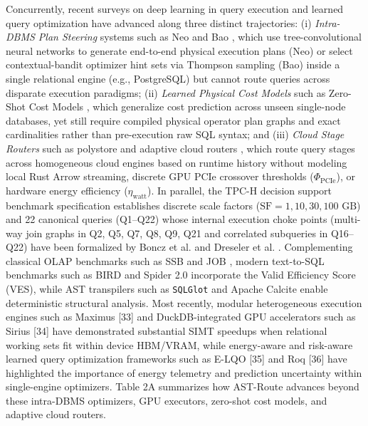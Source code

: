\documentclass[10pt,a4paper]{article}
\begin{document}
Concurrently, recent surveys on deep learning in query execution \cite{milicevic2024dlquery} and learned query optimization have advanced along three distinct trajectories: (i) \emph{Intra-DBMS Plan Steering} systems such as Neo \cite{marcus2019neo} and Bao \cite{marcus2021bao}, which use tree-convolutional neural networks to generate end-to-end physical execution plans (Neo) or select contextual-bandit optimizer hint sets via Thompson sampling (Bao) inside a single relational engine (e.g., PostgreSQL) but cannot route queries across disparate execution paradigms; (ii) \emph{Learned Physical Cost Models} such as Zero-Shot Cost Models \cite{hilprecht2022zeroshot}, which generalize cost prediction across unseen single-node databases, yet still require compiled physical operator plan graphs and exact cardinalities rather than pre-execution raw SQL syntax; and (iii) \emph{Cloud Stage Routers} such as polystore and adaptive cloud routers \cite{tan2023stage, gupta2023adaptive}, which route query stages across homogeneous cloud engines based on runtime history without modeling local Rust Arrow streaming, discrete GPU PCIe crossover thresholds ($\Phi_{\text{PCIe}}$), or hardware energy efficiency ($\eta_{\text{watt}}$). In parallel, the TPC-H decision support benchmark specification \cite{tpc2022tpch} establishes discrete scale factors ($\text{SF}=1, 10, 30, 100\text{ GB}$) and 22 canonical queries (Q1--Q22) whose internal execution choke points (multi-way join graphs in Q2, Q5, Q7, Q8, Q9, Q21 and correlated subqueries in Q16--Q22) have been formalized by Boncz et al. \cite{boncz2014tpch} and Dreseler et al. \cite{dreseler2020quantifying}. Complementing classical OLAP benchmarks such as SSB \cite{oneil2009ssb} and JOB \cite{leis2015job}, modern text-to-SQL benchmarks such as BIRD \cite{li2023bird} and Spider 2.0 \cite{lei2025spider2} incorporate the Valid Efficiency Score (VES), while AST transpilers such as \texttt{SQLGlot} \cite{mao2024sqlglot} and Apache Calcite \cite{begoli2018calcite} enable deterministic structural analysis. Most recently, modular heterogeneous execution engines such as Maximus [33] and DuckDB-integrated GPU accelerators such as Sirius [34] have demonstrated substantial SIMT speedups when relational working sets fit within device HBM/VRAM, while energy-aware and risk-aware learned query optimization frameworks such as E-LQO [35] and Roq [36] have highlighted the importance of energy telemetry and prediction uncertainty within single-engine optimizers. Table 2A summarizes how AST-Route advances beyond these intra-DBMS optimizers, GPU executors, zero-shot cost models, and adaptive cloud routers.
\end{document}
